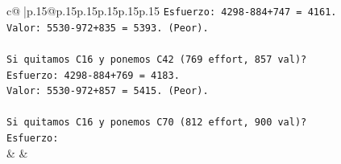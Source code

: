 \documentclass{article}
\begin{document}
{\begin{supertabular}{c@{$\;$}|p{.15\linewidth}@{}p{.15\linewidth}p{.15\linewidth}p{.15\linewidth}p{.15\linewidth}p{.15\linewidth}}
{{{\texttt{Esfuerzo: 4298{-}884+747 = 4161.} \\
\texttt{Valor: 5530{-}972+835 = 5393. (Peor).} \\
\\ 
\texttt{Si quitamos C16 y ponemos C42 (769 effort, 857 val)?} \\
\texttt{Esfuerzo: 4298{-}884+769 = 4183.} \\
\texttt{Valor: 5530{-}972+857 = 5415. (Peor).} \\
\\ 
\texttt{Si quitamos C16 y ponemos C70 (812 effort, 900 val)?} \\
\texttt{Esfuerzo:} \\
            }
        }
    }
    & & \\ \\


\end{supertabular}}
\end{document}
